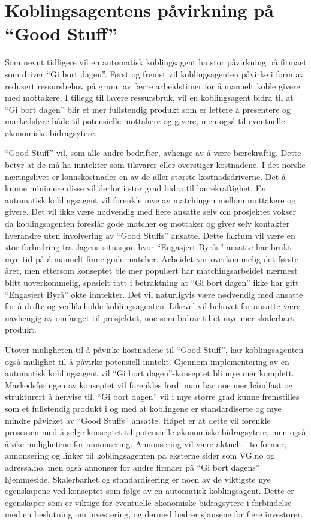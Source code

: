 \section{Koblingsagentens påvirkning på “Good Stuff”}
Som nevnt tidligere vil en automatisk koblingsagent ha stor påvirkning på firmaet som driver “Gi bort dagen”. Først og fremst vil koblingsagenten påvirke i form av redusert ressursbehov på grunn av færre arbeidstimer for å manuelt koble givere med mottakere. I tillegg til lavere ressursbruk, vil en koblingsagent bidra til at “Gi bort dagen” blir et mer fullstendig produkt som er lettere å presentere og markedsføre både til potensielle mottakere og givere, men også til eventuelle økonomiske bidragsytere. 

“Good Stuff” vil, som alle andre bedrifter, avhenge av å være bærekraftig. Dette betyr at de må ha inntekter som tilsvarer eller overstiger kostnadene. I det norske næringslivet er lønnskostnader en av de aller største kostnadsdriverne. Det å kunne minimere disse vil derfor i stor grad bidra til bærekraftighet. En automatisk koblingsagent vil forenkle mye av matchingen mellom mottakere og givere. Det vil ikke være nødvendig med flere ansatte selv om prosjektet vokser da koblingsagenten foreslår gode matcher og mottaker og giver selv kontakter hverandre uten involvering av “Good Stuffs” ansatte. Dette faktum vil være en stor forbedring fra dagens situasjon hvor “Engasjert Byrås” ansatte har brukt mye tid på å manuelt finne gode matcher. Arbeidet var overkommelig det første året, men ettersom konseptet ble mer populært har matchingsarbeidet nærmest blitt uoverkommelig, spesielt tatt i betraktning at “Gi bort dagen” ikke har gitt “Engasjert Byrå” økte inntekter. Det vil naturligvis være nødvendig med ansatte for å drifte og vedlikeholde koblingsagenten. Likevel vil behovet for ansatte være uavhengig av omfanget til prosjektet, noe som bidrar til et mye mer skalerbart produkt. 

Utover muligheten til å påvirke kostnadene til “Good Stuff”, har koblingsagenten også mulighet til å påvirke potensiell inntekt. Gjennom implementering av en automatisk koblingsagent vil “Gi bort dagen”-konseptet bli mye mer komplett. Markedsføringen av konseptet vil forenkles fordi man har noe mer håndfast og strukturert å henvise til. “Gi bort dagen” vil i mye større grad kunne fremstilles som et fullstendig produkt i og med at koblingene er standardiserte og mye mindre påvirket av “Good Stuffs” ansatte. Håpet er at dette vil forenkle prosessen med å selge konseptet til potensielle økonomiske bidragsytere, men også å øke mulighetene for annonsering. Annonsering vil være aktuelt i to former, annonsering og linker til koblingsagenten på eksterne sider som VG.no og adressa.no, men også annonser for andre firmaer på “Gi bort dagens” hjemmeside. Skalerbarhet og standardisering er noen av de viktigste nye egenskapene ved konseptet som følge av en automatisk koblingsagent. Dette er egenskaper som er viktige for eventuelle økonomiske bidragsytere i forbindelse med en beslutning om investering, og dermed bedrer sjansene for flere investorer. 

